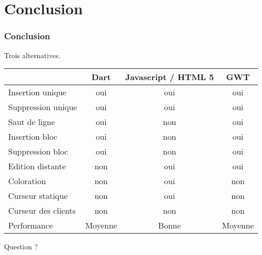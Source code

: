 \section{Conclusion}
  \begin{frame}
    \frametitle{Conclusion}
    Trois alternatives.
    \begin{scriptsize}
      \begin{table}[h!]
        \center
        \begin{tabular}{|l|c|c|c|} 
        \hline
         ~ & Dart & Javascript / HTML 5 & GWT\\
        \hline
        Insertion unique & oui & oui &oui\\
        \hline
        Suppression unique & oui & oui & oui\\
        \hline
        Saut de ligne & oui & non & oui\\
        \hline
        Insertion bloc & oui & non & oui\\
        \hline
        Suppression bloc & oui & non & oui\\
        \hline
        Edition distante & non & oui & oui \\
        \hline
        Coloration & non & oui & non \\
        \hline
        Curseur statique & non & oui & non \\ 
        \hline
        Curseur des clients & non & non & non \\
        \hline
        Performance & Moyenne & Bonne & Moyenne \\ 
        \hline
        \end{tabular}
      \end{table}
    \end{scriptsize}
  \end{frame}

  \begin{frame}
    Question ?
  \end{frame}

